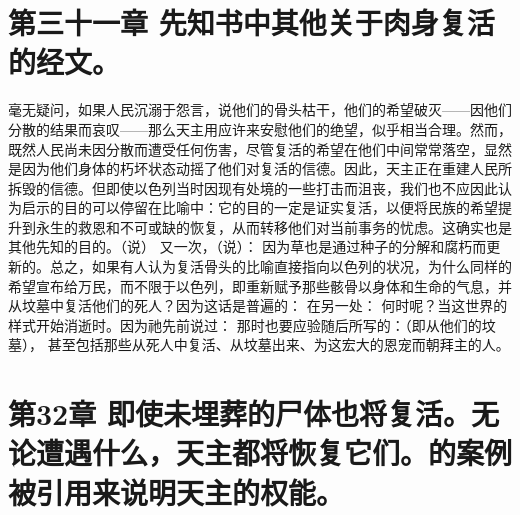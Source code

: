 
\section{第三十一章 先知书中其他关于肉身复活的经文。}

毫无疑问，如果人民沉溺于怨言，说他们的骨头枯干，他们的希望破灭——因他们分散的结果而哀叹——那么天主用应许来安慰他们的绝望，似乎相当合理。然而，既然人民尚未因分散而遭受任何伤害，尽管复活的希望在他们中间常常落空，显然是因为他们身体的朽坏状态动摇了他们对复活的信德。因此，天主正在重建人民所拆毁的信德。但即使以色列当时因现有处境的一些打击而沮丧，我们也不应因此认为启示的目的可以停留在比喻中：它的目的一定是证实复活，以便将民族的希望提升到永生的救恩和不可或缺的恢复，从而转移他们对当前事务的忧虑。这确实也是其他先知的目的。（说） 又一次，（说）： 因为草也是通过种子的分解和腐朽而更新的。总之，如果有人认为复活骨头的比喻直接指向以色列的状况，为什么同样的希望宣布给万民，而不限于以色列，即重新赋予那些骸骨以身体和生命的气息，并从坟墓中复活他们的死人？因为这话是普遍的： 在另一处： 何时呢？当这世界的样式开始消逝时。因为祂先前说过： 那时也要应验随后所写的：（即从他们的坟墓）， 甚至包括那些从死人中复活、从坟墓出来、为这宏大的恩宠而朝拜主的人。\par


\section{第32章 即使未埋葬的尸体也将复活。无论遭遇什么，天主都将恢复它们。的案例被引用来说明天主的权能。}

